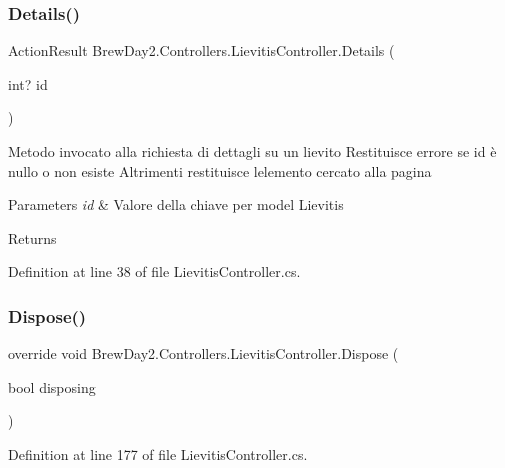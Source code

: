 \subsubsection{\texorpdfstring{Details()}{Details()}}
{\footnotesize\ttfamily Action\+Result Brew\+Day2.\+Controllers.\+Lievitis\+Controller.\+Details (\begin{DoxyParamCaption}\item[{int?}]{id }\end{DoxyParamCaption})}



Metodo invocato alla richiesta di dettagli su un lievito Restituisce errore se id è nullo o non esiste Altrimenti restituisce l\textquotesingle{}elemento cercato alla pagina 


\begin{DoxyParams}{Parameters}
{\em id} & Valore della chiave per model Lievitis\\
\hline
\end{DoxyParams}
\begin{DoxyReturn}{Returns}

\end{DoxyReturn}


Definition at line 38 of file Lievitis\+Controller.\+cs.

\mbox{\label{class_brew_day2_1_1_controllers_1_1_lievitis_controller_aa9b524cd8e58d054551f86244c5fd0a1}} 
\subsubsection{\texorpdfstring{Dispose()}{Dispose()}}
{\footnotesize\ttfamily override void Brew\+Day2.\+Controllers.\+Lievitis\+Controller.\+Dispose (\begin{DoxyParamCaption}\item[{bool}]{disposing }\end{DoxyParamCaption})\hspace{0.3cm}{\ttfamily [protected]}}



Definition at line 177 of file Lievitis\+Controller.\+cs.

\mbox{\label{class_brew_day2_1_1_controllers_1_1_lievitis_controller_a1325a57f77914d9c51fdd500680009d4}} 
